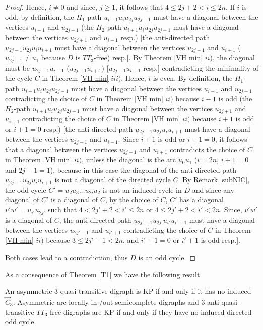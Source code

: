 \begin{proof}
Hence,  $i\neq 0$ and since, $j\ge1$, it follows that $4\le2j+2< i\le 2n$. 
If $i$ is odd, by definition, the $H_1$-path $u_{i-1}u_{i}u_{2j}u_{2j-1}$ must have a diagonal between the vertices  $u_{i-1}$ and $u_{2j-1}$ (the $H_2$-path $u_{i+1}u_{i}u_{2j}u_{2j+1}$ must have a diagonal between the vertices  $u_{2j+1}$ and $u_{i+1}$ resp.) [the anti-directed path $u_{2j-1}u_{2j}u_{i}u_{i+1}$ must have a diagonal between the vertices $u_{2j-1}$ and $u_{i+1}$ ($u_{2j-1}\neq u_{1}$ because $D$ is $TT_3$-free) resp.]. By  Theorem \ref{VH min} $ii)$, the diagonal must be  $u_{2j-1}u_{i-1}$ ($u_{2j+1}u_{i+1}$) [$u_{2j-1}u_{i+1}$ resp.] contradicting the minimality of the cycle $C$ in Theorem \ref{VH min} $iii)$.
%
Hence, $i$ is even. By definition, the $H_1$-path $u_{i-1}u_{i}u_{2j}u_{2j-1}$ must have a diagonal between the vertices  $u_{i-1}$ and $u_{2j-1}$ contradicting the choice of $C$ in Theorem \ref{VH min} $ii)$ because $i-1$ is odd (the $H_2$-path $u_{i+1}u_{i}u_{2j}u_{2j+1}$ must have a diagonal between the vertices  $u_{2j+1}$ and $u_{i+1}$ contradicting the choice of $C$ in Theorem \ref{VH min} $ii)$ because $i+1$ is odd or $i+1=0$ resp.)
%
[the anti-directed path $u_{2j-1}u_{2j}u_{i}u_{i+1}$ must have a diagonal between the vertices $u_{2j-1}$ and $u_{i+1}$. Since $i+1$ is odd or $i+1=0$, it follows that a diagonal between the vertices $u_{2j-1}$ and $u_{i+1}$ contradicts the choice of $C$ in Theorem \ref{VH min} $ii)$, unless the diagonal is the arc  $u_0u_{1}$ ($i=2n$, $i+1=0$ and $2j-1=1$), because in this case the diagonal of the anti-directed path $u_{2j-1}u_{2j}u_{i}u_{i+1}$ is not a diagonal of the directed cycle $C$. By Remark \ref{subNIC}, the odd cycle $C'=u_2u_3\dots u_{2i}u_2$ is not an induced cycle in $D$ and since any diagonal of $C'$ is a diagonal of $C$, by the choice of $C$, $C'$ has a diagonal $v'w'=u_{i'}u_{2j'}$ such that $4< 2j'+2<i'\le 2n$ or $4\le 2j'+2<i'< 2n$. Since, $v'w'$ is a diagonal of $C$, the anti-directed path $u_{2j'-1}u_{2j'}u_{i'}u_{i'+1}$ must have a diagonal between the vertices $u_{2j'-1}$ and $u_{i'+1}$ contradicting the choice of $C$ in Theorem \ref{VH min} $ii)$ because $3\le2j'-1<2n$, and  $i'+1=0$ or $i'+1$ is odd resp.].
%
 
Both cases lead to a contradiction, thus $D$ is an odd cycle.
\end{proof}

As a consequence of  Theorem \ref{T1} we have the following result.
 
\begin{teo}\label{T1 KP}
An asymmetric $3$-quasi-transitive digraph is KP if and only if it has no induced $\overrightarrow{C}_3$.
Asymmetric arc-locally in-/out-semicomplete  digraphs and $3$-anti-quasi-transitive $TT_3$-free digraphs  are KP if and only if they have no induced directed odd cycle.
\end{teo}


